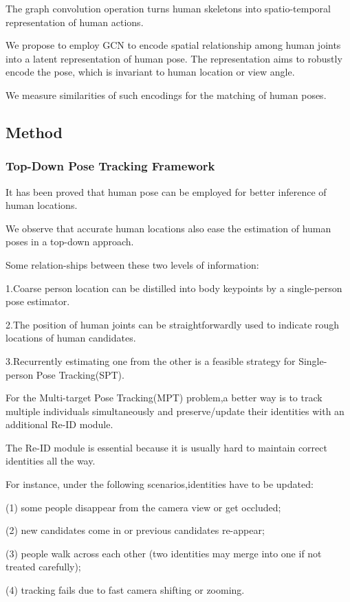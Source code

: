 \documentclass[11pt]{article}
\begin{document}
The graph convolution operation turns human skeletons into spatio-temporal representation of human actions.

We propose to employ GCN to encode spatial relationship among human joints into a latent representation of human pose. The representation aims to robustly encode the pose, which is invariant to human location or view angle.

We measure similarities of such encodings for the matching of human poses.
\subsection{Method}
\subsubsection{Top-Down Pose Tracking Framework}
It has been proved that human pose can be employed for better inference of human locations.

We observe that accurate human locations also ease the estimation of human poses in a top-down approach.

Some relation-ships between these two levels of information:

\noindent 1.Coarse person location can be distilled into body keypoints by a single-person pose estimator.

\noindent 2.The position of human joints can be straightforwardly used to indicate rough locations of human candidates.

\noindent 3.Recurrently estimating one from the other is a feasible strategy for Single-person Pose Tracking(SPT).

For the  Multi-target Pose Tracking(MPT) problem,a better way is to track multiple individuals simultaneously and preserve/update their identities with an additional Re-ID module.

The Re-ID module is essential because it is usually hard to maintain correct identities all the way.

For instance, under the following scenarios,identities have to be updated:

\noindent (1) some people disappear from the camera view or get occluded;

\noindent (2) new candidates come in or previous candidates re-appear;

\noindent (3) people walk across each other (two identities may merge into one if not
treated carefully);

\noindent (4) tracking fails due to fast camera shifting or zooming.
\end{document}
